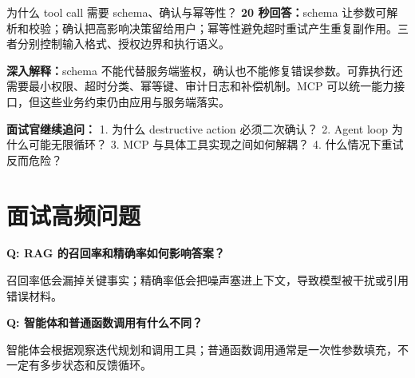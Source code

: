 \begin{interviewbox}{为什么 tool call 需要 schema、确认与幂等性？}
\textbf{20 秒回答：}schema 让参数可解析和校验；确认把高影响决策留给用户；幂等性避免超时重试产生重复副作用。三者分别控制输入格式、授权边界和执行语义。

\textbf{深入解释：}schema 不能代替服务端鉴权，确认也不能修复错误参数。可靠执行还需要最小权限、超时分类、幂等键、审计日志和补偿机制。MCP 可以统一能力接口，但这些业务约束仍由应用与服务端落实。

\textbf{面试官继续追问：}
1. 为什么 destructive action 必须二次确认？
2. Agent loop 为什么可能无限循环？
3. MCP 与具体工具实现之间如何解耦？
4. 什么情况下重试反而危险？
\end{interviewbox}

\section*{面试高频问题}

\textbf{Q: RAG 的召回率和精确率如何影响答案？}

召回率低会漏掉关键事实；精确率低会把噪声塞进上下文，导致模型被干扰或引用错误材料。

\textbf{Q: 智能体和普通函数调用有什么不同？}

智能体会根据观察迭代规划和调用工具；普通函数调用通常是一次性参数填充，不一定有多步状态和反馈循环。
